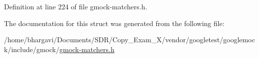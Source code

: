 Definition at line 224 of file gmock-\/matchers.\+h.



The documentation for this struct was generated from the following file\+:\begin{DoxyCompactItemize}
\item 
/home/bhargavi/\+Documents/\+S\+D\+R/\+Copy\+\_\+\+Exam\+\_\+X/vendor/googletest/googlemock/include/gmock/\hyperlink{gmock-matchers_8h}{gmock-\/matchers.\+h}\end{DoxyCompactItemize}
